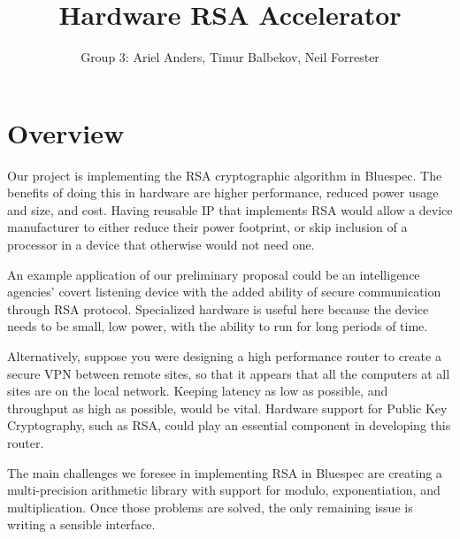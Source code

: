 \documentclass[12pt]{article}
\title{Hardware RSA Accelerator}
\author{Group 3: Ariel Anders, Timur Balbekov, Neil Forrester}
\begin{document}
\maketitle

\section{Overview}
Our project is implementing the RSA cryptographic algorithm in Bluespec.
The benefits of doing this in hardware are higher performance, reduced power usage and size, and cost.
Having reusable IP that implements RSA would allow a device manufacturer to either reduce their
power footprint, or skip inclusion of a processor in a device that otherwise would not need one.

An example application of our preliminary proposal could be an intelligence agencies' covert listening device
with the added ability of secure communication through RSA protocol.
Specialized hardware is useful here because the device needs to be small, low power, with the ability to 
run for long periods of time. 

Alternatively, suppose you were designing a high performance router to create a secure VPN between remote sites,
so that it appears that all the computers at all sites are on the local network.
Keeping latency as low as possible, and throughput as high as possible, would be vital.
Hardware support for Public Key Cryptography, such as RSA,
could play an essential component in developing this router.

The main challenges we foresee in implementing RSA in Bluespec are creating a multi-precision arithmetic library
with support for modulo, exponentiation, and multiplication.
Once those problems are solved, the only remaining issue is writing a sensible interface.
\end{document}
